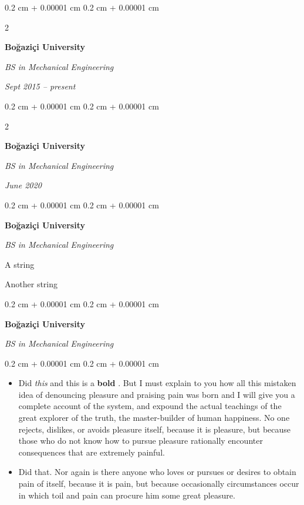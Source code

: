 \documentclass[10pt, letterpaper]{article}
\newenvironment{summary}{
    \begin{description}[
        topsep=0.10 cm,
        parsep=0.10 cm,
        partopsep=0pt,
        itemsep=0pt,
        leftmargin=0.4 cm + 10pt
    ]
}{
    \end{description}
} %
\newenvironment{highlights}{
    \begin{itemize}[
        topsep=0.10 cm,
        parsep=0.10 cm,
        partopsep=0pt,
        itemsep=0pt,
        leftmargin=0.4 cm + 10pt
    ]
}{
    \end{itemize}
} %
\newenvironment{onecolentry}{
    \begin{adjustwidth}{
        0.2 cm + 0.00001 cm
    }{
        0.2 cm + 0.00001 cm
    }
}{
    \end{adjustwidth}
} %
\newenvironment{twocolentry}[2][]{
    \onecolentry
    \def\secondColumn{#2}
    \setcolumnwidth{\fill, 4.5 cm}
    \begin{paracol}{2}
}{
    \switchcolumn \raggedleft \secondColumn
    \end{paracol}
    \endonecolentry
} %
\let\hrefWithoutArrow\href
\renewcommand{\href}[2]{\hrefWithoutArrow{#1}{\ifthenelse{\equal{#2}{}}{ }{#2 }\raisebox{.15ex}{\footnotesize \faExternalLink*}}}
\begin{document}
        \vspace{0.2 cm}

        \begin{twocolentry}{
            
            
        \textit{Sept 2015 – present}}
            \textbf{Boğaziçi University}

            \textit{BS in Mechanical Engineering}
        \end{twocolentry}


        \vspace{0.2 cm}

        \begin{twocolentry}{
            
            
        \textit{June 2020}}
            \textbf{Boğaziçi University}

            \textit{BS in Mechanical Engineering}
        \end{twocolentry}


        \vspace{0.2 cm}

        \begin{onecolentry}
            \textbf{Boğaziçi University}

            \textit{BS in Mechanical Engineering}
        \end{onecolentry}
            \begin{summary}
                \item A string
                \item Another string
            \end{summary}


        \vspace{0.2 cm}

        \begin{onecolentry}
            \textbf{Boğaziçi University}

            \textit{BS in Mechanical Engineering}
        \end{onecolentry}
        \vspace{0.10 cm}
        \begin{onecolentry}
            \begin{highlights}
                \item Did \textit{this} and this is a \textbf{bold} \href{https://example.com}{link}. But I must explain to you how all this mistaken idea of denouncing pleasure and praising pain was born and I will give you a complete account of the system, and expound the actual teachings of the great explorer of the truth, the master-builder of human happiness. No one rejects, dislikes, or avoids pleasure itself, because it is pleasure, but because those who do not know how to pursue pleasure rationally encounter consequences that are extremely painful.
                \item Did that. Nor again is there anyone who loves or pursues or desires to obtain pain of itself, because it is pain, but because occasionally circumstances occur in which toil and pain can procure him some great pleasure.
            \end{highlights}
        \end{onecolentry}
\end{document}
